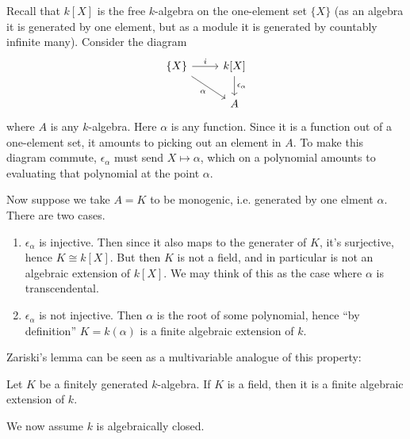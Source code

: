 \documentclass[12pt]{article}
\begin{document}
\begin{example}
	Recall that $k[X]$ is the free $k$-algebra on the one-element set $\{X\}$ (as an algebra it is generated by one element, but as a module it is generated by countably infinite many). Consider the diagram 
	\begin{equation*}
\begin{tikzcd}
\{X\} \arrow[r, "i"] \arrow[rd, "\alpha"'] & {k[X]} \arrow[d, "\epsilon_\alpha"] \\
                                           & A                                  
\end{tikzcd}
	\end{equation*}
	where $A$ is any $k$-algebra. Here $\alpha$ is any function. Since it is a function out of a one-element set, it amounts to picking out an element in $A$. To make this diagram commute, $\epsilon_\alpha$ must send $X\mapsto \alpha$, which on a polynomial amounts to evaluating that polynomial at the point $\alpha$.

	Now suppose we take $A=K$ to be monogenic, i.e. generated by one elment $\alpha$. There are two cases. 
	\begin{enumerate}
		\item $\epsilon_\alpha$ is injective. Then since it also maps to the generater of $K$, it's surjective, hence $K\cong k[X]$. But then $K$ is not a field, and in particular is not an algebraic extension of $k[X]$. We may think of this as the case where $\alpha$ is transcendental.
		\item $\epsilon_\alpha$ is not injective. Then $\alpha$ is the root of some polynomial, hence ``by definition'' $K=k(\alpha)$ is a finite algebraic extension of $k$.
	\end{enumerate}
\end{example}

Zariski's lemma can be seen as a multivariable analogue of this property:

\begin{theorem}
	Let $K$ be a finitely generated $k$-algebra. If $K$ is a field, then it is a finite algebraic extension of $k$.
\end{theorem}

We now assume $k$ is algebraically closed.
\end{document}
